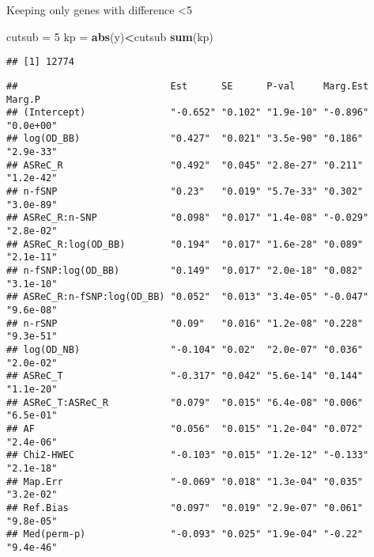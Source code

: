 \documentclass[]{article}
\newenvironment{Shaded}{\begin{snugshade}}{\end{snugshade}}
\newcommand{\KeywordTok}[1]{\textcolor[rgb]{0.13,0.29,0.53}{\textbf{#1}}}
\newcommand{\DecValTok}[1]{\textcolor[rgb]{0.00,0.00,0.81}{#1}}
\newcommand{\StringTok}[1]{\textcolor[rgb]{0.31,0.60,0.02}{#1}}
\newcommand{\OperatorTok}[1]{\textcolor[rgb]{0.81,0.36,0.00}{\textbf{#1}}}
\newcommand{\NormalTok}[1]{#1}
\begin{document}
Keeping only genes with difference \textless{}5

\begin{Shaded}
\begin{Highlighting}[]
\NormalTok{cutsub =}\StringTok{ }\DecValTok{5}
\NormalTok{kp =}\StringTok{ }\KeywordTok{abs}\NormalTok{(y)}\OperatorTok{<}\NormalTok{cutsub}
\KeywordTok{sum}\NormalTok{(kp)}
\end{Highlighting}
\end{Shaded}

\begin{verbatim}
## [1] 12774
\end{verbatim}

\begin{Shaded}
\end{Shaded}

\begin{verbatim}
##                           Est      SE      P-val     Marg.Est Marg.P   
## (Intercept)               "-0.652" "0.102" "1.9e-10" "-0.896" "0.0e+00"
## log(OD_BB)                "0.427"  "0.021" "3.5e-90" "0.186"  "2.9e-33"
## ASReC_R                   "0.492"  "0.045" "2.8e-27" "0.211"  "1.2e-42"
## n-fSNP                    "0.23"   "0.019" "5.7e-33" "0.302"  "3.0e-89"
## ASReC_R:n-SNP             "0.098"  "0.017" "1.4e-08" "-0.029" "2.8e-02"
## ASReC_R:log(OD_BB)        "0.194"  "0.017" "1.6e-28" "0.089"  "2.1e-11"
## n-fSNP:log(OD_BB)         "0.149"  "0.017" "2.0e-18" "0.082"  "3.1e-10"
## ASReC_R:n-fSNP:log(OD_BB) "0.052"  "0.013" "3.4e-05" "-0.047" "9.6e-08"
## n-rSNP                    "0.09"   "0.016" "1.2e-08" "0.228"  "9.3e-51"
## log(OD_NB)                "-0.104" "0.02"  "2.0e-07" "0.036"  "2.0e-02"
## ASReC_T                   "-0.317" "0.042" "5.6e-14" "0.144"  "1.1e-20"
## ASReC_T:ASReC_R           "0.079"  "0.015" "6.4e-08" "0.006"  "6.5e-01"
## AF                        "0.056"  "0.015" "1.2e-04" "0.072"  "2.4e-06"
## Chi2-HWEC                 "-0.103" "0.015" "1.2e-12" "-0.133" "2.1e-18"
## Map.Err                   "-0.069" "0.018" "1.3e-04" "0.035"  "3.2e-02"
## Ref.Bias                  "0.097"  "0.019" "2.9e-07" "0.061"  "9.8e-05"
## Med(perm-p)               "-0.093" "0.025" "1.9e-04" "-0.22"  "9.4e-46"
\end{verbatim}
\end{document}
